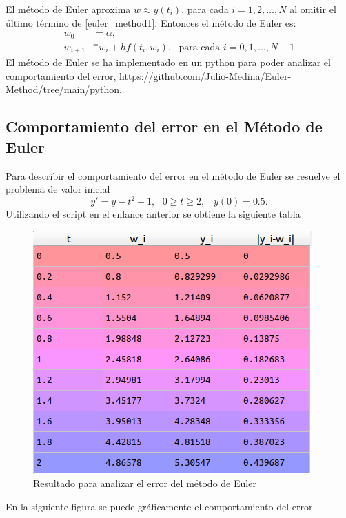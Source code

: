 \documentclass[a4paper]{article}
\begin{document}
El método de Euler aproxima $w\approx y(t_i)$, para cada $i=1,2,\hdots, N$ al omitir el último término de \ref{euler_method1}. Entonces el método de Euler es:
\begin{equation}
\begin{split}
 w_0&=\alpha,\\
 w_{i+1}&^=w_i+h f(t_i, w_i), \,\,\,\, \text{para cada } i=0,1,\hdots, N-1 
\end{split}
\end{equation} 
El método de Euler se ha implementado en un python para poder analizar el comportamiento del error, \url{https://github.com/Julio-Medina/Euler-Method/tree/main/python}.
\subsection{Comportamiento del error en el Método de Euler}
Para describir el comportamiento del error en el método de Euler se resuelve el problema de valor inicial
\begin{equation*}
y'=y-t^2+1,\,\,\,\, 0\geq t\geq 2, \,\,\,\,\, y(0)=0.5.
\end{equation*}
Utilizando el script en el enlance anterior se obtiene la siguiente tabla
\begin{figure}[h]
\begin{center}
\includegraphics[scale=0.38]{./table1.png} 
\end{center} 
\caption{Resultado para analizar el error del método de Euler}

\end{figure}
En la siguiente figura se puede gráficamente el comportamiento del error
\end{document}
